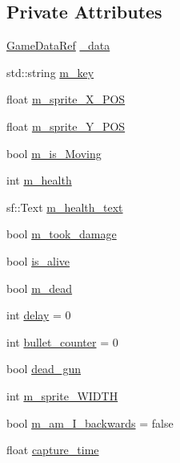 \subsection*{Private Attributes}
\begin{DoxyCompactItemize}
\item 
\hyperlink{namespaceSekander_a1d69b002ba2d23020901c28f0def5e16}{Game\+Data\+Ref} \hyperlink{classSekander_1_1Enemy_aa396253ab86229a1ccd7fd780821dbaa}{\+\_\+data}
\item 
std\+::string \hyperlink{classSekander_1_1Enemy_ae0e65a6e8bd507863c18885083d536ef}{m\+\_\+key}
\item 
float \hyperlink{classSekander_1_1Enemy_aa7f0768b14bb1a963a7b71b4e53538b7}{m\+\_\+sprite\+\_\+\+X\+\_\+\+P\+OS}
\item 
float \hyperlink{classSekander_1_1Enemy_a2987bd4a4703077ba392c61394ba1a70}{m\+\_\+sprite\+\_\+\+Y\+\_\+\+P\+OS}
\item 
bool \hyperlink{classSekander_1_1Enemy_a0e4ef1c23f56e5aafca0548afe52296b}{m\+\_\+is\+\_\+\+Moving}
\item 
int \hyperlink{classSekander_1_1Enemy_a67150f00eab0f36b392e942c5de06c4d}{m\+\_\+health}
\item 
sf\+::\+Text \hyperlink{classSekander_1_1Enemy_ab8bc34ab4da56cb9bf549b84da14b01d}{m\+\_\+health\+\_\+text}
\item 
bool \hyperlink{classSekander_1_1Enemy_a0d11445e38fea6233e044a3e2078f195}{m\+\_\+took\+\_\+damage}
\item 
bool \hyperlink{classSekander_1_1Enemy_adb9b64f9077c99f9ce86627dd6f03edb}{is\+\_\+alive}
\item 
bool \hyperlink{classSekander_1_1Enemy_a7b2f42cd29c9e7ddf9a4b7be2e969ced}{m\+\_\+dead}
\item 
int \hyperlink{classSekander_1_1Enemy_ab69631c38275545e87d25270cce950e0}{delay} = 0
\item 
int \hyperlink{classSekander_1_1Enemy_ad85d76ca502ce719d6c089f9bbfe1500}{bullet\+\_\+counter} = 0
\item 
bool \hyperlink{classSekander_1_1Enemy_a977b28535f3457d2c83c9dcb1c955440}{dead\+\_\+gun}
\item 
int \hyperlink{classSekander_1_1Enemy_ac47bd10558b515703d7ceb582303b56b}{m\+\_\+sprite\+\_\+\+W\+I\+D\+TH}
\item 
bool \hyperlink{classSekander_1_1Enemy_a2e5af993eedfeacbc410a2d70c4ab26b}{m\+\_\+am\+\_\+\+I\+\_\+backwards} = false
\item 
float \hyperlink{classSekander_1_1Enemy_aa00ab089845d470adeae537f1c2cbe57}{capture\+\_\+time}

\end{DoxyCompactItemize}

